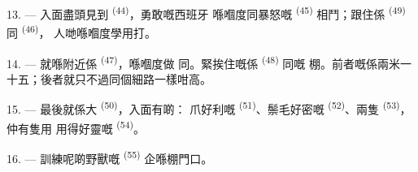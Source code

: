 13. --- 入面盡頭見到 \textsuperscript{(44)}，勇敢嘅西班牙
喺嗰度同暴怒嘅 \textsuperscript{(45)} 相鬥；跟住係
 \textsuperscript{(49)} 同 \textsuperscript{(46)}，
人哋喺嗰度學用打。

14. --- 就喺附近係 \textsuperscript{(47)}，喺嗰度做
同。緊挨住嘅係 \textsuperscript{(48)} 同嘅
棚。前者嘅係兩米一十五；後者就只不過同個細路一樣咁高。

15. --- 最後就係大 \textsuperscript{(50)}，入面有啲：
爪好利嘅 \textsuperscript{(51)}、鬃毛好密嘅
\textsuperscript{(52)}、兩隻 \textsuperscript{(53)}，仲有隻用
用得好靈嘅 \textsuperscript{(54)}。

16. --- 訓練呢啲野獸嘅 \textsuperscript{(55)} 企喺棚門口。
\VUsaut{6.0mm}
\VUfilet{22mm}
